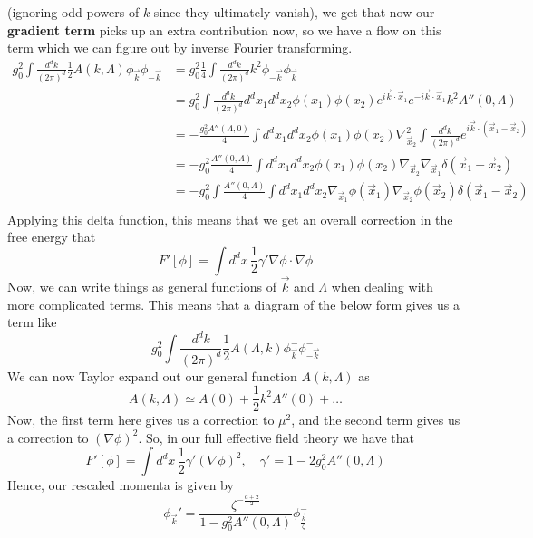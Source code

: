 (ignoring odd powers of $k $ since they ultimately vanish), we get that 
now our \textbf{gradient term } picks up an extra contribution now, 
so we have a flow on this term 
which we can figure out by inverse Fourier transforming. 
\begin{align*}
	g_0 ^ 2 \int \frac{d ^ d k}{ ( 2 \pi ) ^ d } \frac{1}{2 } A ( k , \Lambda ) 
	\phi _{ \vec{k} } \phi _{ - \vec{k} } &=  g_0 ^ 2 \frac{1}{4 } \int 
	\frac{ d ^ d k  }{ ( 2 \pi ) ^ d } k ^ 2 \phi _{ - \vec{k} } \phi _{ \vec{k} } \\
					      &=  g_0 ^ 2 \int \frac{ d ^ d k }{ ( 2 \pi ) ^ d } 
					      d ^ d x_1 d ^ d x_2 \phi ( x_ 1 ) \phi ( x_ 2) 
					      e^{ i \vec{k} \cdot  \vec{x} _ 1 } e ^{ - i \vec{k} \cdot  \vec{x} _ 1 } k ^ 2 A'' ( 0 , \Lambda ) \\
					      &=  - \frac{g_0 ^ 2 A '' ( \Lambda , 0 ) }{ 4 } 
					      \int  d^ d x_1 d ^ d x_2 \phi ( x_1) 
					      \phi ( x_2) \nabla^ 2 _{ \vec{x} _ 2 } \int 
					      \frac{ d ^ d k }{ ( 2 \pi ) ^ d } e ^{ i \vec{k} \cdot  ( \vec{x} _ 1 - \vec{x} _ 2 ) }\\
					      &=  - g_0^ 2 \frac{ A '' ( 0 , \Lambda ) }{ 4 }
					      \int d ^ d x_1 d ^ d x_2 \phi ( x_1 ) 
					      \phi ( x_2 ) \nabla _{ \vec{x} _ 2 } \nabla _{ \vec{x} _ 1 } \delta ( 
					      \vec{x} _ 1- \vec{x} _ 2 ) \\
					      &= - g_0 ^ 2 \int \frac{ A'' ( 0, \Lambda ) }{ 4 } 
					      \int d ^ d x_1 d ^d x_2 \nabla_{ \vec{x} _ 1 } \phi ( \vec{x} _ 1 ) \nabla _{ \vec{x} _ 2 } \phi( { \vec{x} _ 2 }) \delta ( \vec{x} _ 1 - \vec{x} _ 2 )  \\
\end{align*}
Applying this delta function, this means that we get an overall correction in 
the free energy that 
\[
 F ' [ \phi ] = \int d ^ d x \, \frac{1}{2 } \gamma ' \nabla \phi \cdot  \nabla  \phi 
\] 
Now, we can write things as general functions of $ \vec{k}  $ and $\Lambda $
when dealing with more complicated terms. 
This means that a diagram of the below form gives us a term like 
\[
	g_0 ^ 2 \int \frac{ d ^ d k }{ ( 2 \pi ) ^ d } \frac{1}{2 } A( \Lambda , k) \phi_{\vec{k} } ^ - 
	\phi _{  - \vec{k} } ^ -  
\] We can now Taylor expand out our general function 
$ A ( k, \Lambda ) $ as 
 \[
	 A ( k , \Lambda ) \simeq A ( 0 ) + \frac{1}{2 } k ^ 2 A'' ( 0 ) + \dots
 \] Now, the first term here
 gives us a correction to $\mu ^ 2  $, and the second term 
 gives us a correction to $ ( \nabla \phi ) ^ 2 $. 
 So, in our full effective field theory we have that 
 \[
	 F ' [ \phi ] = \int d^ d x \, \frac{1}{2 } \gamma ' ( \nabla \phi ) ^ 2, 
	 \quad \gamma ' =  1- 2 g_0 ^ 2 A'' ( 0 , \Lambda ) 
 \] Hence, our rescaled momenta is given by 
 \[
	 \phi_{ \vec{k} } ' = \frac{ \zeta ^{  - \frac{ d + 2 }{ 2 } } }{1 - g_0 ^ 2 A'' ( 0 
	 , \Lambda ) } \phi_{ \frac{ \vec{k} }{ \zeta } } ^ - 
 \]
